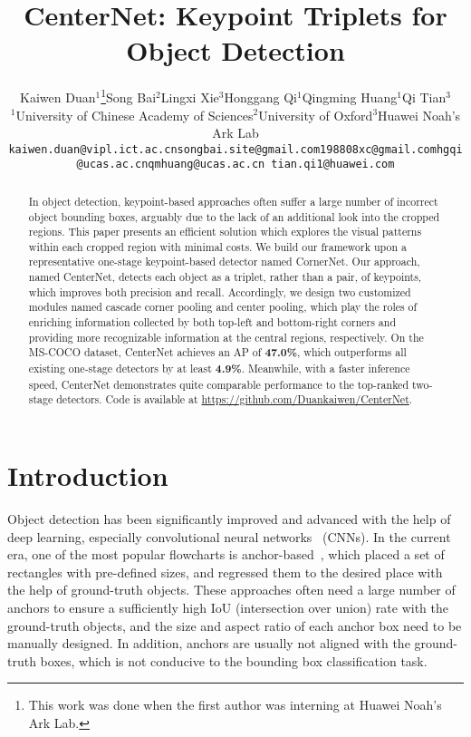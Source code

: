 \documentclass[10pt,twocolumn,letterpaper]{article}
\begin{document}
\title{CenterNet: Keypoint Triplets for Object Detection}
\author{Kaiwen Duan$^{1}$\thanks{This work was done when the first author was interning at Huawei Noah's Ark Lab.}\qquad Song Bai$^{2}$\qquad Lingxi Xie$^{3}$\qquad Honggang Qi$^{1}$\qquad Qingming Huang$^{1}$\qquad Qi Tian$^{3}$\\
$^{1}$University of Chinese Academy of Sciences\qquad $^{2}$University of Oxford\qquad$^{3}$Huawei Noah's Ark Lab\\
{\tt\small kaiwen.duan@vipl.ict.ac.cn\qquad songbai.site@gmail.com\qquad 198808xc@gmail.com\qquad hgqi@ucas.ac.cn\qquad qmhuang@ucas.ac.cn \qquad tian.qi1@huawei.com}}
\maketitle



\begin{abstract}
In object detection, keypoint-based approaches often suffer a large number of incorrect object bounding boxes, arguably due to the lack of an additional look into the cropped regions. This paper presents an efficient solution which explores the visual patterns within each cropped region with minimal costs. We build our framework upon a representative one-stage keypoint-based detector named CornerNet. Our approach, named CenterNet, detects each object as a triplet, rather than a pair, of keypoints, which improves both precision and recall. Accordingly, we design two customized modules named cascade corner pooling and center pooling, which play the roles of enriching information collected by both top-left and bottom-right corners and providing more recognizable information at the central regions, respectively. On the MS-COCO dataset, CenterNet achieves an AP of \textbf{47.0\%}, which outperforms all existing one-stage detectors by at least \textbf{4.9\%}. Meanwhile, with a faster inference speed, CenterNet demonstrates quite comparable performance to the top-ranked two-stage detectors. Code is available at \url{https://github.com/Duankaiwen/CenterNet}.
\end{abstract}\section{Introduction}
Object detection has been significantly improved and advanced with the help of deep learning, especially convolutional neural networks~\cite{girshick2014rich} (CNNs). In the current era, one of the most popular flowcharts is anchor-based~\cite{girshick2015fast,he2017mask,liu2016ssd,redmon2016you, ren2015faster}, which placed a set of rectangles with pre-defined sizes, and regressed them to the desired place with the help of ground-truth objects. These approaches often need a large number of anchors to ensure a sufficiently high IoU (intersection over union) rate with the ground-truth objects, and the size and aspect ratio of each anchor box need to be manually designed. In addition, anchors are usually not aligned with the ground-truth boxes, which is not conducive to the bounding box classification task.
\end{document}
